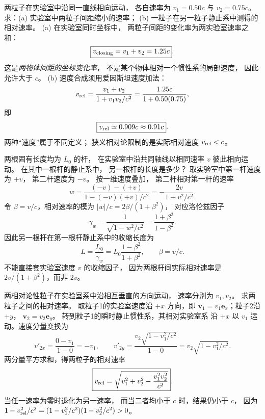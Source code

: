 两粒子在实验室中沿同一直线相向运动，
各自速率为 $v_1=0.50c$ 与 $v_2=0.75c$。
求：(a) 实验室中两粒子间距缩小的速率；
(b) 一粒子在另一粒子静止系中测得的相对速率。
\exsolution
(a) 在实验室同时坐标中，
两粒子间距的变化率为两实验室速率之和：
\[
\boxed{v_{\rm closing}=v_1+v_2
=1.25c}.
\]
这是\emph{两物体间距的坐标变化率}，
不是某个物体相对一个惯性系的局部速度，
因此允许大于 $c$。
(b) 速度合成须用爱因斯坦速度加法：
\[
v_{\rm rel}=\frac{v_1+v_2}{1+v_1v_2/c^2}
=\frac{1.25c}{1+0.50(0.75)},
\]
即
\[
\boxed{v_{\rm rel}\simeq0.909c\approx0.91c}.
\]
\excheck 两种“速度”属于不同定义；
狭义相对论限制的是实际相对速度 $v_{\rm rel}<c$。

两根固有长度均为 $L_0$ 的杆，
在实验室中沿共同轴线以相同速率 $v$
彼此相向运动。
在其中一根杆的静止系中，
另一根杆的长度是多少？
\exsolution
取实验室中第一杆速度为 $+v$，
第二杆速度为 $-v$。
按一维速度叠加，
第二杆相对第一杆的速率
\[
w=\frac{(-v)-(+v)}{1-(-v)(+v)/c^2}
=-\frac{2v}{1+v^2/c^2}.
\]
令 $\beta=v/c$，相对速率的模为
$|w|/c=2\beta/(1+\beta^2)$，
对应洛伦兹因子
\[
\gamma_w=
\frac1{\sqrt{1-w^2/c^2}}
=\frac{1+\beta^2}{1-\beta^2}.
\]
因此另一根杆在第一根杆静止系中的收缩长度为
\[
\boxed{L=\frac{L_0}{\gamma_w}
=L_0\frac{1-\beta^2}{1+\beta^2}},
\qquad\beta=v/c.
\]
\excheck 不能直接套实验室速度 $v$ 的收缩因子，
因为两根杆间实际相对速率是
$2v/(1+\beta^2)$，而非 $2v$。


两相对论性粒子在实验室系中沿相互垂直的方向运动，
速率分别为 $v_1,v_2$。
求两粒子之间的相对速率。
\exsolution
取粒子1的实验室速度沿 $+x$ 方向，即
$\bm v_1=v_1\bm e_x$；粒子2沿 $+y$，
$\bm v_2=v_2\bm e_y$。
转到粒子1的瞬时静止惯性系，其相对实验室系
沿 $+x$ 以 $v_1$ 运动。速度分量变换为
\[
v'_{2x}=\frac{0-v_1}{1-0}=-v_1,\qquad
v'_{2y}=\frac{v_2\sqrt{1-v_1^2/c^2}}{1-0}
=v_2\sqrt{1-v_1^2/c^2}.
\]
两分量平方求和，得两粒子的相对速率
\[
\boxed{v_{\rm rel}=
\sqrt{v_1^2+v_2^2-\frac{v_1^2v_2^2}{c^2}}}.
\]
\excheck 当任一速率为零时退化为另一速率，
而当二者均小于 $c$ 时，结果仍小于 $c$，
因为
$1-v_{\rm rel}^2/c^2=
(1-v_1^2/c^2)(1-v_2^2/c^2)>0$。


